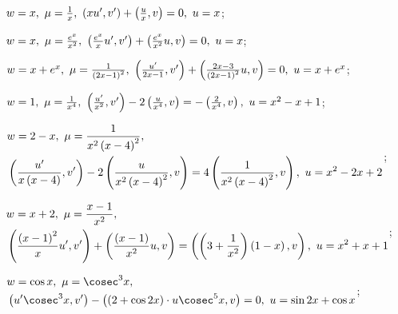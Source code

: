 	\begin{enumsolsfull}

		\label{sol:bvp_green:int_factor}
		\item \( w = x, ~ \mu = \frac{1}{x}, ~ \left( xu', v' \right) + \left( \frac{u}{x}, v \right) = 0, ~ u = x \); %
		\item \( w = x, ~ \mu = \frac{e^x}{x^2}, ~ \left( \frac{e^x}{x} u', v' \right) + \left( \frac{e^x}{x^2} u, v \right) = 0, ~ u = x \); %
		\item \( w = x + e^x, ~ \mu = \frac{1}{\left( 2x - 1 \right)^2}, ~ \left( \frac{u'}{2x - 1}, v' \right) + \left( \frac{2x - 3}{\left( 2x - 1 \right)^2} u, v \right) = 0, ~ u = x + e^x \); %
		\item \( w = 1, ~ \mu = \frac{1}{x^4}, ~ \left( \frac{u'}{x^2}, v' \right) - 2\left( \frac{u}{x^4}, v \right) = -\left( \frac{2}{x^4}, v \right), ~ u = x^2 - x + 1 \); %
		\item \( \begin{aligned} &w = 2 - x, ~ \mu = \frac{1}{x^2 \left( x - 4 \right)^2}, \\ &\left( \frac{u'}{x\left( x - 4 \right)}, v' \right) - 2\left( \frac{u}{x^2 \left( x - 4 \right)^2}, v \right) = 4 \left( \frac{1}{x^2 \left( x - 4 \right)^2}, v \right), ~ u = x^2 - 2x + 2 \end{aligned} \); %
		\item \( \begin{aligned} &w = x + 2, ~ \mu = \frac{x - 1}{x^2}, \\ &\left( \frac{\left( x-1 \right)^2}{x} u', v' \right) + \left( \frac{\left( x-1 \right)}{x^2} u, v \right) = \left( \left( 3 + \frac{1}{x^2} \right) \left( 1 - x \right), v \right), ~ u = x^2 + x + 1 \end{aligned} \); %
		\item \( \begin{aligned} &w = \cos{x}, ~ \mu = \cosec^3{x}, \\ &\pares{u' \cosec^3{x}, v'} - \pares{\pares{2 + \cos{2x}} \cdot u \cosec^5{x}, v} = 0, ~ u = \sin{2x} + \cos{x} \end{aligned} \); %

\end{enumsolsfull}
